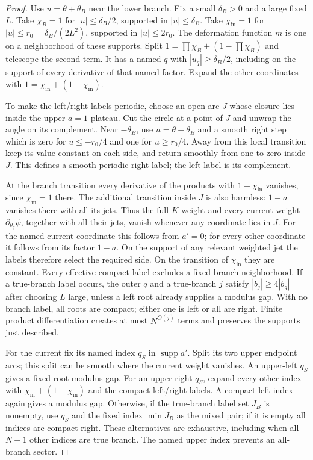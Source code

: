 \documentclass[11pt]{article}
\numberwithin{equation}{section}
\theoremstyle{definition}
\begin{document}
\begin{proof}
Use \(u=\theta+\theta_B\) near the lower branch. Fix a small
\(\delta_B>0\) and a large fixed \(L\).
Take \(\chi_B=1\) for \(|u|\le\delta_B/2\), supported in
\(|u|\le\delta_B\). Take \(\chi_{\mathrm{in}}=1\) for
\(|u|\le r_0=\delta_B/(2L^2)\), supported in \(|u|\le2r_0\).
The deformation function \(m\) is one on a neighborhood of these
supports.
Split \(1=\prod\chi_B+(1-\prod\chi_B)\) and telescope the second
term. It has a named \(q\) with \(|u_q|\ge\delta_B/2\),
including on the support of every derivative of that named factor.
Expand the other coordinates with \(1=\chi_{\mathrm{in}}+(1-\chi_{\mathrm{in}})\).

To make the left/right labels periodic, choose an open arc \(J\)
whose closure lies inside the upper \(a=1\) plateau. Cut the circle
at a point of \(J\) and unwrap the angle on its complement. Near
\(-\theta_B\), use \(u=\theta+\theta_B\) and a smooth right step
which is zero for \(u\le-r_0/4\) and one for \(u\ge r_0/4\).
Away from this local transition keep its value constant on each
side, and return smoothly from one to zero inside \(J\).
This defines a smooth periodic right label; the left label is its
complement.

At the branch transition every derivative of the products with
\(1-\chi_{\mathrm{in}}\) vanishes, since \(\chi_{\mathrm{in}}=1\) there. The additional
transition inside \(J\) is also harmless: \(1-a\) vanishes there
with all its jets. Thus the full \(K\)-weight and every current
weight \(\partial_{\theta_q}\psi\), together with all their jets,
vanish whenever any coordinate lies in \(J\). For the named current
coordinate this follows from \(a'=0\); for every other coordinate
it follows from its factor \(1-a\). On the support of any relevant
weighted jet the labels therefore select the required side.
On the transition of \(\chi_{\mathrm{in}}\) they are constant. Every effective
compact label excludes a fixed branch neighborhood.
If a true-branch label occurs, the outer
\(q\) and a true-branch \(j\) satisfy
\(|b_j|\ge4|b_q|\) after choosing \(L\) large, unless a left root
already supplies a modulus gap.
With no branch label, all roots are compact; either one is left or
all are right. Finite product differentiation creates at most
\(N^{O(j)}\) terms and preserves the supports just described.

For the current fix its named index \(q_S\) in
\(\operatorname{supp}a'\). Split its two upper endpoint arcs;
this split can be smooth where the current weight vanishes.
An upper-left \(q_S\) gives a fixed root modulus gap.
For an upper-right \(q_S\), expand every other index with
\(\chi_{\mathrm{in}}+(1-\chi_{\mathrm{in}})\) and the compact
left/right labels. A compact left index again gives a modulus
gap. Otherwise, if the true-branch label set \(J_B\) is nonempty,
use \(q_S\) and the fixed index \(\min J_B\) as the mixed pair;
if it is empty all indices are compact right. These alternatives
are exhaustive, including when all \(N-1\) other indices are
true branch. The named upper index prevents an all-branch sector.


\end{proof}
\end{document}
